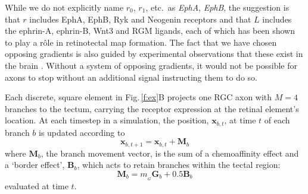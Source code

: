 \documentclass[11pt, a4paper, draft]{article}
\begin{document}
While we do not explicitly name $r_0$, $r_1$,
etc.~as \emph{EphA}, \emph{EphB}, the suggestion is that $r$ includes EphA,
EphB, Ryk \citep{schmitt_wntryk_2006} and
Neogenin \citep{rajagopalan_neogenin_2004} receptors and that $L$ includes the
ephrin-A, ephrin-B, Wnt3 \citep{schmitt_wntryk_2006} and
RGM \citep{monnier_rgm_2002} ligands, each of which has been shown to play a
r\^ole in retinotectal map formation. The fact that we have chosen opposing
gradients is also guided by experimental observations that these exist in the
brain \citep{opposing_gradients}. Without a system of opposing gradients, it
would not be possible for axons to stop without an additional signal
instructing them to do so.




Each discrete, square element in Fig.\,\ref{f:ex}B projects one RGC axon with $M=4$
branches to the tectum, carrying the receptor expression at the retinal
element's location.
At each timestep in a simulation, the position, $\mathbf{x}_{b,t}$, at time
$t$ of each branch $b$ is updated according to
%
\begin{equation}
\mathbf{x}_{b,t+1} = \mathbf{x}_{b,t} + \mathbf{M}_{b}
\end{equation}
%
where $\mathbf{M}_{b}$, the branch movement vector, is the sum of a chemoaffinity
effect and a `border effect', $\mathbf{B}_b$, which acts to retain branches
within the tectal region:
%
\begin{equation} \label{e:mv}
\mathbf{M}_{b} = m_{\!_G} \mathbf{G}_b + 0.5 \mathbf{B}_b
\end{equation}
%
evaluated at time $t$.
\end{document}
